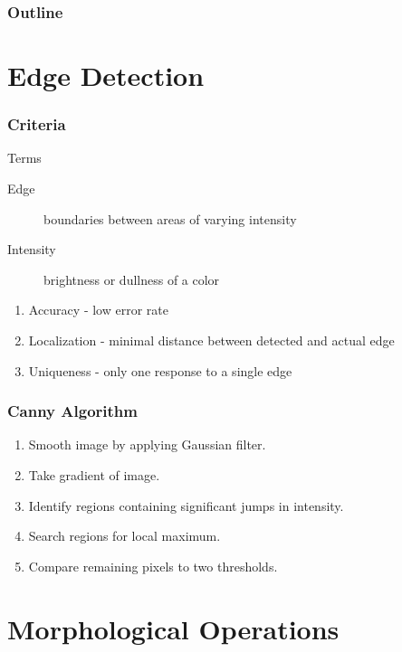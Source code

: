 \documentclass{beamer}
\newcommand{\linespace}{\vskip 0.25cm}
\begin{document}
\begin{frame}
  \frametitle{Outline}
  \tableofcontents[hideallsubsections]
\end{frame}

\section[Edge Detection]{Edge Detection}

\begin{frame}
\frametitle{Criteria}
Terms
\begin{description}
\item[Edge] boundaries between areas of varying intensity
\item[Intensity] brightness or dullness of a color
\end{description}
\linespace
\linespace
\begin{enumerate}
\item Accuracy     - low error rate
\item Localization - minimal distance between detected and actual edge
\item Uniqueness   - only one response to a single edge
\end{enumerate}
\end{frame}

\begin{frame}
\frametitle{Canny Algorithm}
\begin{enumerate}
\item Smooth image by applying Gaussian filter.
\linebreak
\item Take gradient of image.
\linebreak
\item Identify regions containing significant jumps in intensity.
\linebreak
\item Search regions for local maximum.
\linebreak
\item Compare remaining pixels to two thresholds.
\end{enumerate}
\end{frame}

\section[Morphological Operations]{Morphological Operations}
\end{document}
